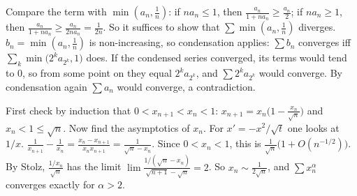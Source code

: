 \documentclass[11pt,a4paper]{article}
\begin{document}
 Compare the term with \(\min(a_n,\frac1n)\): if \(na_n\le1\), then \(\frac{a_n}{1+na_n}\ge\frac{a_n}2\); if \(na_n\ge1\), then \(\frac{a_n}{1+na_n}\ge\frac{a_n}{2na_n}=\frac1{2n}\). So it suffices to show that \(\sum\min(a_n,\frac1n)\) diverges.
 \(b_n=\min(a_n,\frac1n)\) is non-increasing, so condensation applies: \(\sum b_n\) converges iff \(\sum_k\min\bigl(2^ka_{2^k},1\bigr)\) does.
 If the condensed series converged, its terms would tend to \(0\), so from some point on they equal \(2^ka_{2^k}\), and \(\sum2^ka_{2^k}\) would converge. By condensation again \(\sum a_n\) would converge, a contradiction.

 First check by induction that \(0\lt x_{n+1}\lt x_n\lt1\): \(x_{n+1}=x_n\bigl(1-\frac{x_n}{\sqrt n}\bigr)\) and \(x_n\lt1\le\sqrt n\). Now find the asymptotics of \(x_n\). For \(x'=-x^2/\sqrt t\) one looks at \(1/x\).
 \(\frac1{x_{n+1}}-\frac1{x_n}=\frac{x_n-x_{n+1}}{x_nx_{n+1}}=\frac{1}{\sqrt n-x_n}\). Since \(0\lt x_n\lt1\), this is \(\frac1{\sqrt n}\bigl(1+O(n^{-1/2})\bigr)\).
 By Stolz, \(\frac{1/x_n}{\sqrt n}\) has the limit \(\lim\frac{1/(\sqrt n-x_n)}{\sqrt{n+1}-\sqrt n}=2\). So \(x_n\sim\frac1{2\sqrt n}\), and \(\sum x_n^\alpha\) converges exactly for \(\alpha\gt2\).
\end{document}
